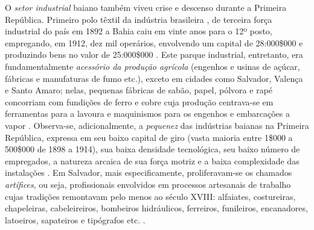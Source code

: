 O \textit{setor industrial} baiano também viveu crise e descenso durante a Primeira República. Primeiro polo têxtil da indústria brasileira \cite{stein_textil_1979}, de terceira força industrial do país em 1892 a Bahia caiu em vinte anos para o 12º posto, empregando, em 1912, dez mil operários, envolvendo um capital de 28:000\$000 e produzindo bens no valor de 25:000\$000 \cite[p.~29-30]{CPE1980}. Este parque industrial, entretanto, era fundamentalmente \textit{acessório da produção agrícola} (engenhos e usinas de açúcar, fábricas e manufaturas de fumo etc.), exceto em cidades como Salvador, Valença e Santo Amaro; nelas, pequenas fábricas de sabão, papel, pólvora e rapé concorriam com fundições de ferro e cobre cuja produção centrava-se em ferramentas para a lavoura e maquinismos para os engenhos e embarcações a vapor \cite[p.~30]{CPE1980}. Observa-se, adicionalmente, a \textit{pequenez} das indústrias baianas na Primeira República, expressa em seu baixo capital de giro (vasta maioria entre 1\$000 a 500\$000 de 1898 a 1914), sua baixa densidade tecnológica, seu baixo número de empregados, a natureza arcaica de sua força motriz e a baixa complexidade das instalações \cite[p.~55]{CPE1980}. Em Salvador, mais especificamente, proliferavam-se os chamados \textit{artífices}, ou seja, profissionais envolvidos em processos artesanais de trabalho cujas tradições remontavam pelo menos ao século XVIII: alfaiates, costureiras, chapeleiras, cabeleireiros, bombeiros hidráulicos, ferreiros, funileiros, encanadores, latoeiros, sapateiros e tipógrafos etc. \cite{CPE1980,REIS2012}.


